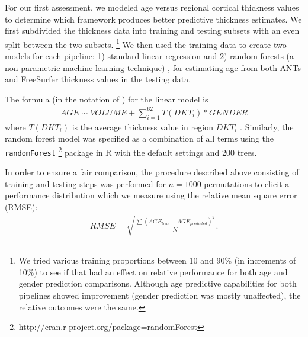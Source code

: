For our first assessment, we modeled age versus regional cortical thickness values 
to determine which framework produces better predictive thickness estimates.  We first
subdivided the thickness data into training and testing subsets with an even split
between the two subsets.%
\footnote{
We tried various training proportions between 10 and 90\% (in increments of 10\%)
to see if that had an effect on relative performance for both age and 
gender prediction comparisons. Although age predictive capabilities for 
both pipelines showed improvement (gender prediction was mostly unaffected), 
the relative outcomes were the same.  
}
We then used the training data to create two models for each pipeline:
1) standard linear regression
and 2) random forests (a non-parametric machine learning technique) \citep{breiman2001},
for estimating age from both ANTs and FreeSurfer thickness values in the testing data.  

The formula (in the notation of \cite{wilkinson1973}) for the linear model is
\begin{align}
  AGE \sim VOLUME + \sum_{i=1}^{62} T(DKT_{i})*GENDER
\end{align}
where $T(DKT_{i})$ is the average thickness value in region $DKT_{i}$ {\color{blue}{
and $VOLUME$ is total intracranial volume}}.
Similarly, the random forest 
model was specified as a combination of all terms
using the {\tt randomForest}%
\footnote{
http://cran.r-project.org/package=randomForest
}
package in R with the default settings and 200 trees.

In order to ensure a fair comparison, the procedure described above consisting
of training and testing steps was performed for $n = 1000$ permutations to elicit a 
performance distribution which we measure using the relative mean square
error (RMSE):
\begin{align}
  RMSE = \sqrt{\frac{\sum \left(AGE_{true} - AGE_{predicted} \right)^2}{N}}.
\end{align}
{}


